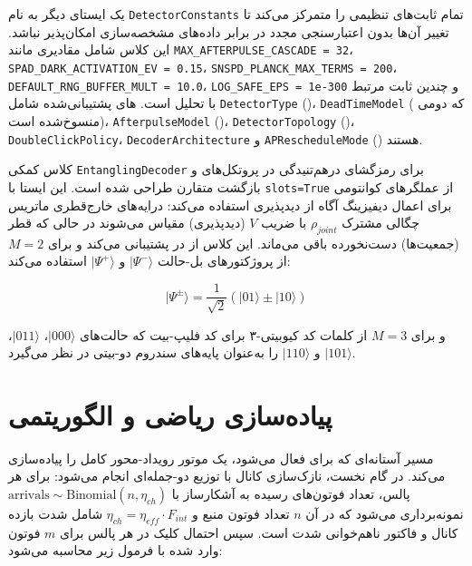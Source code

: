 یک  ایستای دیگر به نام \texttt{DetectorConstants} تمام ثابت‌های تنظیمی را متمرکز می‌کند تا تغییر آن‌ها بدون اعتبارسنجی مجدد در برابر داده‌های مشخصه‌سازی امکان‌پذیر نباشد. این کلاس شامل مقادیری مانند \texttt{MAX\_AFTERPULSE\_CASCADE = 32}، \texttt{SPAD\_DARK\_ACTIVATION\_EV = 0.15}، \texttt{SNSPD\_PLANCK\_MAX\_TERMS = 200}، \texttt{DEFAULT\_RNG\_BUFFER\_MULT = 10.0}، \texttt{LOG\_SAFE\_EPS = 1e-300} و چندین ثابت مرتبط با تحلیل  است. های پشتیبانی‌شده شامل \texttt{DetectorType} ()، \texttt{DeadTimeModel} ( که دومی منسوخ‌شده است)، \texttt{AfterpulseModel} ()، \texttt{DetectorTopology} ()، \texttt{DoubleClickPolicy}، \texttt{DecoderArchitecture} و \texttt{APRescheduleMode} () هستند.

کلاس کمکی \texttt{EntanglingDecoder} برای رمزگشای درهم‌تنیدگی در پروتکل‌های  و بازگشت متقارن  طراحی شده است. این  ایستا با \texttt{slots=True} از عملگرهای کوانتومی  برای اعمال دیفیزینگ  آگاه از دیدپذیری  استفاده می‌کند: درایه‌های خارج‌قطری ماتریس چگالی مشترک $\rho_{joint}$ با ضریب $V$ (دیدپذیری) مقیاس می‌شوند در حالی که قطر (جمعیت‌ها) دست‌نخورده باقی می‌ماند. این کلاس از  در  پشتیبانی می‌کند و برای $M=2$ از پروژکتورهای بل-حالت $|\Psi^-\rangle$ و $|\Psi^+\rangle$ استفاده می‌کند:

\begin{equation}
	|\Psi^\pm\rangle = \frac{1}{\sqrt{2}}\left(|01\rangle \pm |10\rangle\right)
\end{equation}

و برای $M=3$ از کلمات کد کیوبیتی-۳ برای کد فلیپ-بیت که حالت‌های $|000\rangle$، $|011\rangle$، $|101\rangle$ و $|110\rangle$ را به‌عنوان پایه‌های سندروم دو-بیتی در نظر می‌گیرد.

\section{پیاده‌سازی ریاضی و الگوریتمی}

مسیر آستانه‌ای  که برای  فعال می‌شود، یک موتور رویداد-محور کامل را پیاده‌سازی می‌کند. در گام نخست، نازک‌سازی کانال  با توزیع دو-جمله‌ای انجام می‌شود: برای هر پالس، تعداد فوتون‌های رسیده به آشکارساز با $\text{arrivals} \sim \text{Binomial}(n, \eta_{ch})$ نمونه‌برداری می‌شود که در آن $n$ تعداد فوتون منبع و $\eta_{ch} = \eta_{eff} \cdot F_{int}$ شامل شدت بازده کانال و فاکتور ناهم‌خوانی شدت است. سپس احتمال کلیک در هر پالس برای $m$ فوتون وارد شده با فرمول زیر محاسبه می‌شود:

